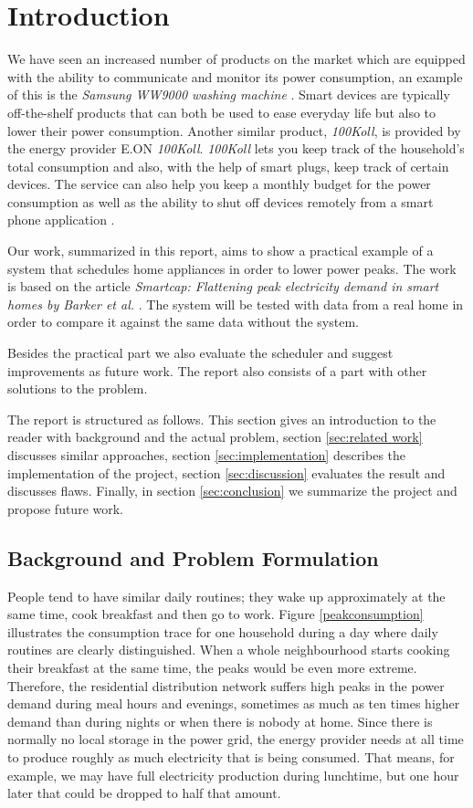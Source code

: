 \section{Introduction}
We have seen an increased number of products on the market which are equipped with the ability to communicate and monitor its power consumption, an example of this is the \emph{Samsung WW9000 washing machine} \cite{samsungww9000}. Smart devices are typically off-the-shelf products that can both be used to ease everyday life but also to lower their power consumption. Another similar product, \emph{100Koll}, is provided by the energy provider E.ON \emph{100Koll}. \emph{100Koll} lets you keep track of the household's total consumption and also, with the help of smart plugs, keep track of certain devices. The service can also help you keep a monthly budget for the power consumption as well as the ability to shut off devices remotely from a smart phone application \cite{eon}.

Our work, summarized in this report, aims to show a practical example of a system that schedules home appliances in order to lower power peaks. The work is based on the article \emph{Smartcap: Flattening peak electricity demand in smart homes by Barker et al.} \cite{barker2012smartcap}. The system will be tested with data from a real home in order to compare it against the same data without the system.

Besides the practical part we also evaluate the scheduler and suggest improvements as future work. The report also consists of a part with other solutions to the problem.

The report is structured as follows. This section gives an introduction to the reader with background and the actual problem, section \ref{sec:related work} discusses similar approaches, section \ref{sec:implementation} describes the implementation of the project, section \ref{sec:discussion} evaluates the result and discusses flaws. Finally, in section \ref{sec:conclusion} we summarize the project and propose future work.

\subsection{Background and Problem Formulation}
People tend to have similar daily routines; they wake up approximately at the same time, cook breakfast and then go to work. Figure \ref{peakconsumption} illustrates the consumption trace for one household during a day where daily routines are clearly distinguished. When a whole neighbourhood starts cooking their breakfast at the same time, the peaks would be even more extreme. Therefore, the residential distribution network suffers high peaks in the power demand during meal hours and evenings, sometimes as much as ten times higher demand than during nights or when there is nobody at home. Since there is normally no local storage in the power grid, the energy provider needs at all time to produce roughly as much electricity that is being consumed. That means, for example, we may have full electricity production during lunchtime, but one hour later that could be dropped to half that amount. 

